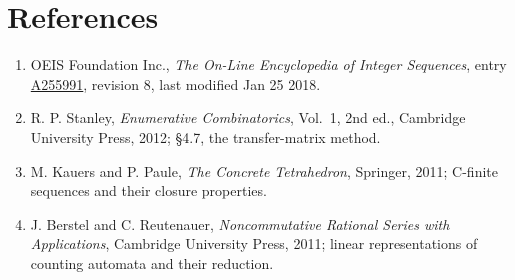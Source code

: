 \documentclass[11pt]{article}
\theoremstyle{definition}
\begin{document}
\section{References}

\begin{enumerate}

\item OEIS Foundation Inc., \emph{The On-Line Encyclopedia of Integer Sequences}, entry \href{https://oeis.org/A255991}{A255991}, revision 8, last modified Jan 25 2018.

\item R. P. Stanley, \emph{Enumerative Combinatorics}, Vol.~1, 2nd ed., Cambridge University Press, 2012; \S4.7, the transfer-matrix method.

\item M. Kauers and P. Paule, \emph{The Concrete Tetrahedron}, Springer, 2011; C-finite sequences and their closure properties.

\item J. Berstel and C. Reutenauer, \emph{Noncommutative Rational Series with Applications}, Cambridge University Press, 2011; linear representations of counting automata and their reduction.

\end{enumerate}
\end{document}
